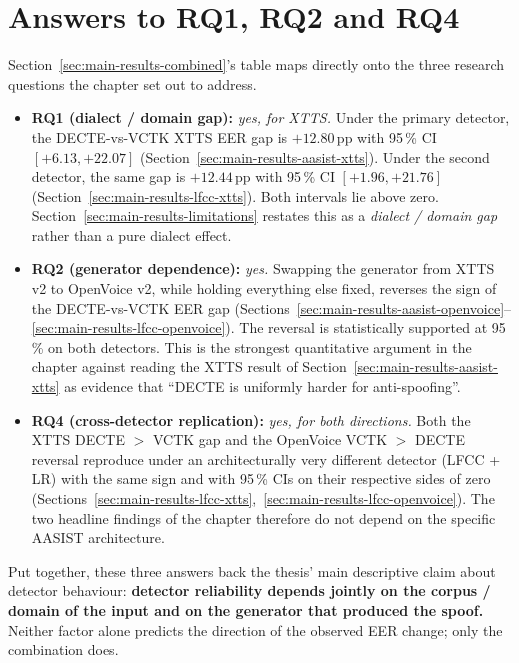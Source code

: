 \section{Answers to RQ1, RQ2 and RQ4}
\label{sec:main-results-rq-answers}

Section~\ref{sec:main-results-combined}'s table maps directly onto the three research
questions the chapter set out to address.

\begin{itemize}
    \item \textbf{RQ1 (dialect / domain gap):} \emph{yes, for XTTS.} Under the primary
        detector, the DECTE-vs-VCTK XTTS EER gap is $+12.80$\,pp with 95\,\%
        CI $[+6.13, +22.07]$ (Section~\ref{sec:main-results-aasist-xtts}). Under the second detector, the
        same gap is $+12.44$\,pp with 95\,\% CI $[+1.96, +21.76]$
        (Section~\ref{sec:main-results-lfcc-xtts}). Both intervals lie above zero. Section~\ref{sec:main-results-limitations}
        restates this as a \emph{dialect / domain gap} rather than a pure
        dialect effect.
    \item \textbf{RQ2 (generator dependence):} \emph{yes.} Swapping the generator
        from XTTS v2 to OpenVoice v2, while holding everything else
        fixed, reverses the sign of the DECTE-vs-VCTK EER gap
        (Sections~\ref{sec:main-results-aasist-openvoice}--\ref{sec:main-results-lfcc-openvoice}). The reversal is statistically supported at
        95\,\% on both detectors. This is the strongest quantitative
        argument in the chapter against reading the XTTS result of
        Section~\ref{sec:main-results-aasist-xtts} as evidence that ``DECTE is uniformly harder for
        anti-spoofing''.
    \item \textbf{RQ4 (cross-detector replication):} \emph{yes, for both directions.}
        Both the XTTS DECTE $>$ VCTK gap and the OpenVoice VCTK $>$ DECTE
        reversal reproduce under an architecturally very different
        detector (LFCC + LR) with the same sign and with 95\,\% CIs on
        their respective sides of zero (Sections~\ref{sec:main-results-lfcc-xtts},~\ref{sec:main-results-lfcc-openvoice}). The two
        headline findings of the chapter therefore do not depend on the
        specific AASIST architecture.
\end{itemize}

Put together, these three answers back the thesis' main
descriptive claim about detector behaviour: \textbf{detector
reliability depends jointly on the corpus / domain of the input
and on the generator that produced the spoof.} Neither factor
alone predicts the direction of the observed EER change; only the
combination does.

